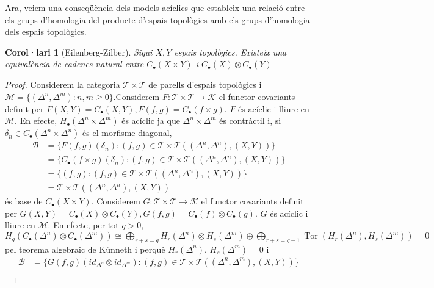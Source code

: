 \documentclass[compress]{article}
\newtheorem{corolari}{Corol·lari}
\theoremstyle{definition}
\DeclareMathOperator{\Tor}{Tor}
\begin{document}
Ara, veiem una conseqüència dels models acíclics que estableix una relació entre els grups d'homologia del producte d'espais topològics amb els grups d'homologia dels espais topològics.
\begin{corolari}[Eilenberg-Zilber]
    Sigui $X,Y$ espais topològics. Existeix una equivalència de cadenes natural entre $C_{\bullet}(X\times Y)$ i $C_{\bullet}(X)\otimes C_{\bullet}(Y)$   
\end{corolari}
\begin{proof}
    Considerem la categoria $\mathscr{T}\times\mathscr{T}$ de parells d'espais topològics i $\mathscr{M}=\{(\Delta^{n},\Delta^{m}):n,m\geq0\}$.\newline Considerem $F:\mathscr{T}\times\mathscr{T}\rightarrow\mathscr{K}$ el functor covariants definit per $F(X,Y)=C_{\bullet}(X,Y),F(f,g)=C_{\bullet}(f\times g)$. $F$ és acíclic i lliure en $\mathscr{M}$. En efecte, $H_{\bullet}(\Delta^{n}\times\Delta^{m})$ és acíclic ja que $\Delta^{n}\times\Delta^{m}$ és contràctil i, si $\delta_{n}\in C_{\bullet}(\Delta^{n}\times\Delta^{n})$ és el morfisme diagonal,
    \begin{align*}
        \mathscr{B}
        &=\{F(f,g)(\delta_{n}):(f,g)\in\mathscr{T}\times\mathscr{T}((\Delta^{n},\Delta^{n}),(X,Y))\}\\
        &=\{C_{\bullet}(f\times g)(\delta_{n}):(f,g)\in\mathscr{T}\times\mathscr{T}((\Delta^{n},\Delta^{n}),(X,Y))\}\\
        &=\{(f,g):(f,g)\in\mathscr{T}\times\mathscr{T}((\Delta^{n},\Delta^{n}),(X,Y))\}\\
        &=\mathscr{T}\times\mathscr{T}((\Delta^{n},\Delta^{n}),(X,Y))
    \end{align*}
    és base de $C_{\bullet}(X\times Y)$.\newline
    Considerem $G:\mathscr{T}\times\mathscr{T}\rightarrow\mathscr{K}$ el functor covariants definit per $G(X,Y)=C_{\bullet}(X)\otimes C_{\bullet}(Y),G(f,g)=C_{\bullet}(f)\otimes C_{\bullet}(g)$. $G$ és acíclic i lliure en $\mathscr{M}$. En efecte, per tot $q>0$, $H_{q}(C_{\bullet}(\Delta^{n})\otimes C_{\bullet}(\Delta^{m}))\cong\bigoplus_{r+s=q}H_{r}(\Delta^{n})\otimes H_{s}(\Delta^{m})\oplus\bigoplus_{r+s=q-1}\Tor(H_{r}(\Delta^{n}),H_{s}(\Delta^{m}))=0$ pel teorema algebraic de Künneth i perquè $H_{r}(\Delta^{n})$, $H_{s}(\Delta^{m})=0$ i
    \begin{align*}
        \mathscr{B}
        &=\{G(f,g)(id_{\Delta^{n}}\otimes id_{\Delta^{m}}):(f,g)\in\mathscr{T}\times\mathscr{T}((\Delta^{n},\Delta^{m}),(X,Y))\}\\

\end{align*}
\end{proof}
\end{document}
